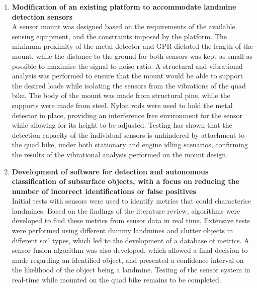 \documentclass[main.tex]{subfiles}
\begin{document}
\begin{enumerate}
\item \textbf{Modification of an existing platform to accommodate landmine detection sensors}\\ 
A sensor mount was designed based on the requirements of the available sensing equipment, and the constraints imposed by the platform. The minimum proximity of the metal detector and GPR dictated the length of the mount, while the distance to the ground for both sensors was kept as small as possible to maximise the signal to noise ratio. A structural and vibrational analysis was performed to ensure that the mount would be able to support the desired loads while isolating the sensors from the vibrations of the quad bike. The body of the mount was made from structural pine, while the supports were made from steel. Nylon rods were used to hold the metal detector in place, providing an interference free environment for the sensor while allowing for its height to be adjusted.   
Testing has shown that the detection capacity of the individual sensors is unhindered by attachment to the quad bike, under both stationary and engine idling scenarios, confirming the results of the vibrational analysis performed on the mount design.

\item \textbf{Development of software for detection and autonomous classification of subsurface objects, with a focus on reducing the number of incorrect identifications or false positives}\\ 
Initial tests with sensors were used to identify metrics that could characterise landmines. Based on the findings of the literature review, algorithms were developed to find these metrics from sensor data in real time. Extensive tests were performed using different dummy landmines and clutter objects in different soil types, which led to the development of a database of metrics. A sensor fusion algorithm was also developed, which allowed a final decision to made regarding an identified object, and presented a confidence interval on the likelihood of the object being a landmine. Testing of the sensor system in real-time while mounted on the quad bike remains to be completed.
\end{enumerate}
\end{document}
